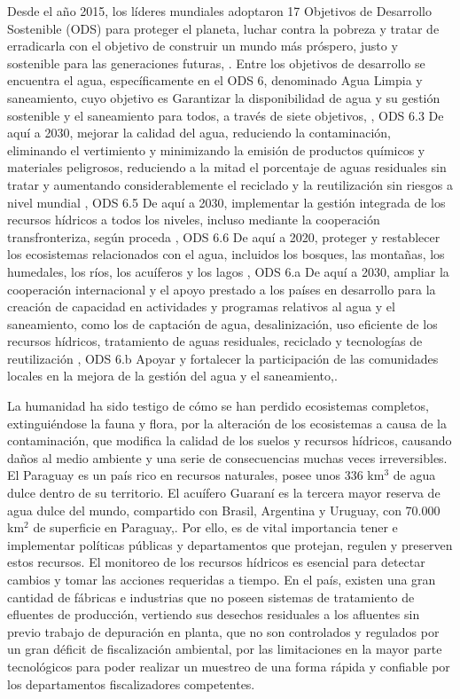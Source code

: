 Desde el a\~no 2015, los líderes mundiales adoptaron 17 Objetivos de Desarrollo Sostenible (ODS) para proteger el planeta, luchar contra la pobreza y tratar de erradicarla con el objetivo de construir un mundo más próspero,  justo y sostenible para las generaciones futuras, \cite{bbva_que_nodate}. 
Entre los objetivos de desarrollo se encuentra el agua, espec\'ificamente en el ODS 6, denominado Agua Limpia y saneamiento, cuyo objetivo es Garantizar la disponibilidad de agua y su gestión sostenible y el saneamiento para todos, a trav\'es de siete objetivos, \cite{onu_agua_nodate} 
, ODS 6.3  De aquí a 2030, mejorar la calidad del agua, reduciendo la contaminación, eliminando el vertimiento y minimizando la emisión de productos químicos y materiales peligrosos, reduciendo a la mitad el porcentaje de aguas residuales sin tratar y aumentando considerablemente el reciclado y la reutilización sin riesgos a nivel mundial
, ODS 6.5  De aquí a 2030, implementar la gestión integrada de los recursos hídricos a todos los niveles, incluso mediante la cooperación transfronteriza, según proceda
, ODS 6.6  De aquí a 2020, proteger y restablecer los ecosistemas relacionados con el agua, incluidos los bosques, las montañas, los humedales, los ríos, los acuíferos y los lagos
, ODS 6.a  De aquí a 2030, ampliar la cooperación internacional y el apoyo prestado a los países en desarrollo para la creación de capacidad en actividades y programas relativos al agua y el saneamiento, como los de captación de agua, desalinización, uso eficiente de los recursos hídricos, tratamiento de aguas residuales, reciclado y tecnologías de reutilización
, ODS 6.b  Apoyar y fortalecer la participación de las comunidades locales en la mejora de la gestión del agua y el saneamiento,\cite{moran_agua_nodate}.

La humanidad ha sido testigo de c\'omo se han perdido ecosistemas completos, extinguiéndose la fauna y flora, por la alteraci\'on de los ecosistemas a causa de la contaminaci\'on, que modifica la calidad de los suelos y recursos h\'idricos, causando da\~nos al medio ambiente y una serie de consecuencias muchas veces irreversibles.
El Paraguay es un pa\'is rico en recursos naturales, posee unos 336 km$^3$ de agua dulce dentro de su territorio. 
El acuífero Guaraní es la tercera mayor reserva de agua dulce del mundo, compartido con Brasil, Argentina y Uruguay, con 70.000 km$^{2}$ de superficie en Paraguay,\cite{stp_Agua}. 
Por ello, es de vital importancia tener e implementar políticas p\'ublicas y departamentos que protejan, regulen y preserven estos recursos.
El monitoreo de los recursos hídricos es esencial para detectar cambios y tomar las acciones requeridas a tiempo.
En el país, existen una gran cantidad de fábricas e industrias que no poseen sistemas de tratamiento de efluentes de producci\'on, vertiendo sus desechos residuales a los afluentes sin previo trabajo de depuración en planta, que no son controlados y regulados por un gran déficit de fiscalización ambiental, por las limitaciones en la mayor parte tecnol\'ogicos para poder realizar un muestreo de una forma r\'apida y confiable por los departamentos fiscalizadores competentes. 


